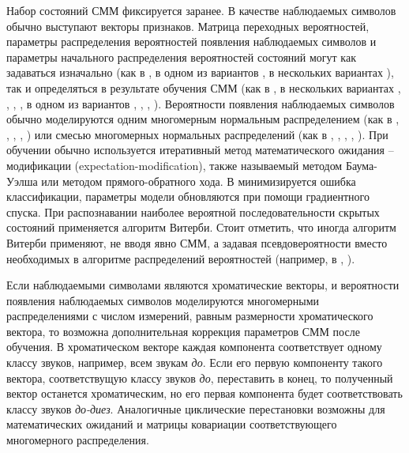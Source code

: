 Набор состояний СММ фиксируется заранее. В качестве наблюдаемых символов обычно
выступают векторы признаков. Матрица переходных вероятностей, параметры
распределения вероятностей появления наблюдаемых символов и параметры начального
распределения вероятностей состояний могут как задаваться изначально (как в
\cite{Bello2005}, в одном из вариантов \cite{Papadopoulos2007}, в нескольких
вариантах \cite{Cho2010}), так и определяться в результате обучения СММ (как в
\cite{Burgoyne2007}, в нескольких вариантах \cite{Papadopoulos2007},
 \cite{Mauch2008}, \cite{Khadkevich2009}, \cite{Reed2009}, в одном из вариантов
\cite{Cho2010}, \cite{Jiang2011}, \cite{Khadkevich2011}, \cite{Ni2011}).
Вероятности появления наблюдаемых символов обычно моделируются одним многомерным
нормальным распределением (как в \cite{Sheh2003}, \cite{Bello2005},
\cite{Papadopoulos2007}, \cite{Ni2011}, \cite{Chen2012}) или смесью многомерных
нормальных распределений (как в \cite{Burgoyne2007}, \cite{Khadkevich2009},
\cite{Reed2009}, \cite{Cho2010}, \cite{Khadkevich2011}). При обучении обычно
используется итеративный метод математического ожидания -- модификации
(expectation-modification), также называемый методом Баума-Уэлша или методом
прямого-обратного хода. В \cite{Reed2009} минимизируется ошибка классификации,
параметры модели обновляются при помощи градиентного спуска. При распознавании
наиболее вероятной последовательности скрытых состояний применяется алгоритм
Витерби. Стоит отметить, что иногда алгоритм Витерби применяют, не вводя явно
СММ, а задавая псевдовероятности вместо необходимых в алгоритме распределений
вероятностей (например, в \cite{Cho2011}, \cite{Humphrey2012}).

Если наблюдаемыми символами являются хроматические векторы, и вероятности
появления наблюдаемых символов моделируются многомерными распределениями с
числом измерений, равным размерности хроматического вектора, то возможна
дополнительная коррекция параметров СММ после обучения. В хроматическом векторе
каждая компонента соответствует одному классу звуков, например, всем звукам
\emph{до}. Если его первую компоненту такого вектора, соответствущую классу
звуков \emph{до}, переставить в конец, то полученный вектор останется
хроматическим, но его первая компонента будет соответствовать классу звуков
\emph{до-диез}. Аналогичные циклические перестановки возможны для математических
ожиданий и матрицы ковариации соответствующего многомерного распределения.

